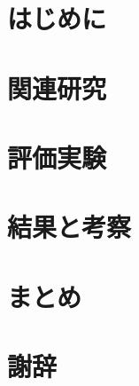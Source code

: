 \documentclass[11pt, a4paper, titlepage, dvipdfmx, uplatex]{jsarticle}
\date{要記入：提出日}
\begin{document}
\maketitle

\begin{abstract}

\end{abstract}

\newpage

\tableofcontents %
\thispagestyle{empty}
\newpage

\setcounter{page}{1}
\section{はじめに}


\section{関連研究}


\section{評価実験}


\section{結果と考察}


\section{まとめ}


\newpage
\section*{謝辞}

\newpage

\begin{onehalfspace}


\newpage
\end{onehalfspace}

\end{document}
